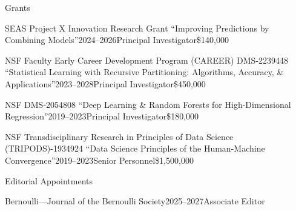 \documentclass{resume}
\begin{document}
\begin{rSection}{Grants}

\begin{rSubsection}{SEAS Project X Innovation Research Grant ``Improving Predictions by Combining Models''}{2024--2026}{Principal Investigator}{\$140,000}
\end{rSubsection}

\begin{rSubsection}{NSF Faculty Early Career Development Program (CAREER) DMS-2239448 ``Statistical Learning with Recursive Partitioning: Algorithms, Accuracy, \& Applications''}{2023--2028}{Principal Investigator}{\$450,000}
\end{rSubsection}
\begin{rSubsection}{NSF DMS-2054808 ``Deep Learning \& Random Forests for High-Dimensional Regression''}{2019--2023}{Principal Investigator}{\$180,000}
\end{rSubsection}
\begin{rSubsection}{NSF Transdisciplinary Research in Principles of Data Science (TRIPODS)-1934924 ``Data Science Principles of the Human-Machine Convergence''}{2019--2023}{Senior Personnel}{\$1,500,000}
\end{rSubsection}

\end{rSection}

\begin{rSection}{Editorial Appointments}
\begin{rSubsection}{Bernoulli---Journal of the Bernoulli Society}{2025--2027}{Associate Editor}{}
\end{rSubsection}

\end{rSection}

\end{document}
